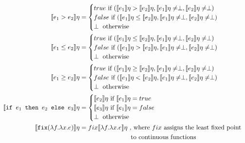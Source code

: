 \begin{align*}
 \\
  \llbracket e_1 > e_2 \rrbracket\eta &= 
 \begin{cases} 
      true \text{ if } (\llbracket e_1 \rrbracket\eta > \llbracket e_2 \rrbracket\eta, \llbracket e_1 \rrbracket\eta \neq \perp, \llbracket e_2 \rrbracket\eta \neq \perp) \\
      false \text{  if } (\llbracket e_1 \rrbracket\eta \leq \llbracket e_2\rrbracket\eta, \llbracket e_1 \rrbracket\eta \neq \perp, \llbracket e_2 \rrbracket\eta \neq \perp)\\
      \perp \text{ otherwise}
   \end{cases}
 \\
  \llbracket e_1 \leq e_2 \rrbracket\eta &= 
 \begin{cases} 
      true \text{ if } (\llbracket e_1 \rrbracket\eta \leq \llbracket e_2 \rrbracket\eta, \llbracket e_1 \rrbracket\eta \neq \perp, \llbracket e_2 \rrbracket\eta \neq \perp) \\
      false \text{  if } (\llbracket e_1 \rrbracket\eta > \llbracket e_2\rrbracket\eta, \llbracket e_1 \rrbracket\eta \neq \perp, \llbracket e_2 \rrbracket\eta \neq \perp)\\
      \perp \text{ otherwise}
   \end{cases}
 \\
  \llbracket e_1 \geq e_2 \rrbracket\eta &= 
 \begin{cases} 
      true \text{ if } (\llbracket e_1 \rrbracket\eta \geq \llbracket e_2 \rrbracket\eta, \llbracket e_1 \rrbracket\eta \neq \perp, \llbracket e_2 \rrbracket\eta \neq \perp) \\
      false \text{  if } (\llbracket e_1 \rrbracket\eta < \llbracket e_2\rrbracket\eta, \llbracket e_1 \rrbracket\eta \neq \perp, \llbracket e_2 \rrbracket\eta \neq \perp)\\
      \perp \text{ otherwise}
   \end{cases}
 \\
  \llbracket \texttt{if } e_1 \texttt{ then } e_2 \texttt{ else } e_3 \rrbracket \eta &= 
 \begin{cases} 
      \llbracket e_2 \rrbracket\eta \text{ if } \llbracket e_1 \rrbracket\eta = true \\
      \llbracket e_3 \rrbracket\eta \text{ if } \llbracket e_1 \rrbracket\eta = false \\
      \perp \text{      otherwise} \\
   \end{cases}
  \\
   \llbracket  \texttt{fix} (\lambda f.\lambda x.e) \rrbracket\eta &= fix\llbracket \lambda f.\lambda x.e \rrbracket\eta \
 \text{, where } fix \text{ assigns the least fixed point} \\ 
 &\text{ \ \ \ \ \ \ \ \ \ \ \ \ \ \ \ \ \ \ \ \ \ \ \ to continuous functions} \\
 \end{align*}
